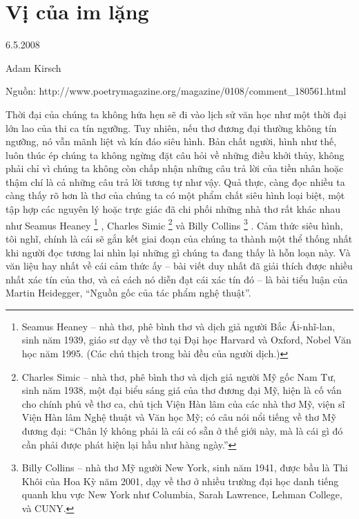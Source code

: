 \documentclass[../main.tex]{subfiles}
\begin{document}
\chapter{Vị của im lặng}

\begin{metadata}

\begin{flushright}6.5.2008\end{flushright}

Adam Kirsch

Nguồn: http://www.poetrymagazine.org/magazine/0108/comment_180561.html

\end{metadata}

\begin{multicols}{2}

Thời đại của chúng ta không hứa hẹn sẽ đi vào lịch sử văn học như một thời đại lớn lao của thi ca tín ngưỡng. Tuy nhiên, nếu thơ đương đại thường không tín ngưỡng, nó vẫn mãnh liệt và kín đáo siêu hình. Bản chất người, hình như thế, luôn thúc ép chúng ta không ngừng đặt câu hỏi về những điều khởi thủy, không phải chỉ vì chúng ta không còn chấp nhận những câu trả lời của tiền nhân hoặc thậm chí là cả những câu trả lời tương tự như vậy. Quả thực, càng đọc nhiều ta càng thấy rõ hơn là thơ của chúng ta có một phẩm chất siêu hình loại biệt, một tập hợp các nguyên lý hoặc trực giác đã chi phối những nhà thơ rất khác nhau như Seamus Heaney \footnote{
Seamus Heaney – nhà thơ, phê bình thơ và dịch giả người Bắc Ái-nhĩ-lan, sinh năm 1939, giáo sư dạy về thơ tại Đại học Harvard và Oxford, Nobel Văn học năm 1995. (Các chú thịch trong bài đều của người dịch.)} , Charles Simic \footnote{
Charles Simic – nhà thơ, phê bình thơ và dịch giả người Mỹ gốc Nam Tư, sinh năm 1938, một đại biểu sáng giá của thơ đương đại Mỹ, hiện là cố vấn cho chính phủ về thơ ca, chủ tịch Viện Hàn lâm của các nhà thơ Mỹ, viện sĩ Viện Hàn lâm Nghệ thuật và Văn học Mỹ; có câu nói nổi tiếng về thơ Mỹ đương đại: “Chân lý không phải là cái có sẵn ở thế giới này, mà là cái gì đó cần phải được phát hiện lại hầu như hàng ngày.”} và Billy Collins \footnote{
Billy Collins – nhà thơ Mỹ người New York, sinh năm 1941, được bầu là Thi Khôi của Hoa Kỳ năm 2001, dạy về thơ ở nhiều trường đại học danh tiếng quanh khu vực New York như Columbia, Sarah Lawrence, Lehman College, và CUNY.} . Cảm thức siêu hình, tôi nghĩ, chính là cái sẽ gắn kết giai đoạn của chúng ta thành một thể thống nhất khi người đọc tương lai nhìn lại những gì chúng ta đang thấy là hỗn loạn này. Và văn liệu hay nhất về cái cảm thức ấy – bài viết duy nhất đã giải thích được nhiều nhất xác tín của thơ, và cả cách nó diễn đạt cái xác tín đó – là bài tiểu luận của Martin Heidegger, “Nguồn gốc của tác phẩm nghệ thuật”. 


\end{multicols}
\end{document}
